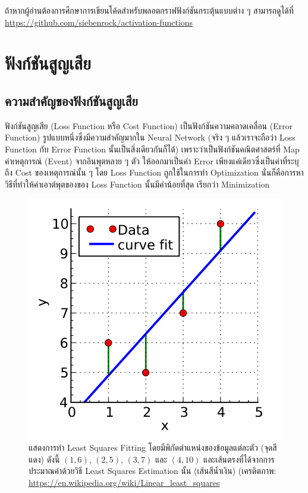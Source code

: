 ถ้าหากผู้อ่านต้องการศึกษาการเขียนโค้ดสำหรับพลอตกราฟฟังก์ชันกระตุ้นแบบต่าง ๆ สามารถดูได้ที่ 
\url{https://github.com/siebenrock/activation-functions}

\section{ฟังก์ชันสูญเสีย}
\label{sec:loss_func}

\subsection{ความสำคัญของฟังก์ชันสูญเสีย}

ฟังก์ชันสูญเสีย (Loss Function หรือ Cost Function) เป็นฟังก์ชันความคลาดเคลื่อน (Error Function) รูปแบบหนึ่งซึ่งมีความสำคัญมากใน 
Neural Network (จริง ๆ แล้วเราจะถือว่า Loss Function กับ Error Function นั้นเป็นสิ่งเดียวกันก็ได้) เพราะว่าเป็นฟังก์ชันคณิตศาสตร์ที่ 
Map ค่าเหตุการณ์ (Event) จากอินพุตหลาย ๆ ตัว ให้ออกมาเป็นค่า Error เพียงแค่เดียวซึ่งเป็นค่าที่ระบุถึง Cost ของเหตุการณ์นั้น ๆ โดย Loss 
Function ถูกใช้ในการทำ Optimization นั่นก็คือการหาวิธีที่ทำให้ค่าเอาต์พุตของของ Loss Function นั้นมีค่าน้อยที่สุด เรียกว่า Minimization 

\begin{figure}[H]
    \centering
    \includegraphics[width=0.7\linewidth]{fig/least-squares-fitting.png}
    \caption{แสดงการทำ Least Squares Fitting โดยมีพิกัดตำแหน่งของข้อมูลแต่ละตัว (จุดสีแดง) ดังนี้ $(1,6)$, $(2,5)$, $(3,7)$ 
    และ $(4,10)$ และเส้นตรงที่ได้จากการประมาณค่าด้วยวิธี Least Squares Estimation นั้น (เส้นสีน้ำเงิน) (เครดิตภาพ: 
    \url{https://en.wikipedia.org/wiki/Linear_least_squares}}
    \label{fig:least_square_fitting}
\end{figure}

